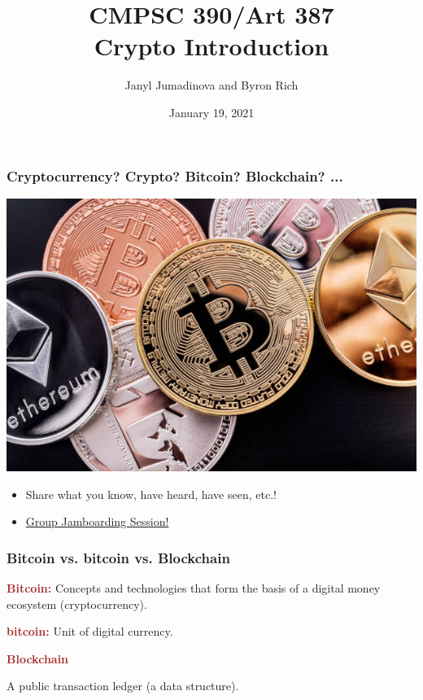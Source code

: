 \documentclass{beamer}
\title{CMPSC 390/Art 387 \\ Crypto Introduction }
\author{Janyl Jumadinova and Byron Rich}
\date{January 19, 2021}
\begin{document}
\begin{frame}
  \titlepage
\end{frame}

\begin{frame}
  \frametitle{Cryptocurrency? Crypto? Bitcoin? Blockchain? ... }
  	\centering \includegraphics[scale=1.6]{crypto}
	\begin{itemize}
		\item Share what you know, have heard, have seen, etc.! \pause
		\item \textcolor{blue}{\href{https://jamboard.google.com/d/11aMUTrsNXKniKVkajcfThbODdwsedcUUsrVuGIbXTAo/edit?usp=sharing}{Group Jamboarding Session!}}
	\end{itemize}
\end{frame}
\begin{frame}
  \frametitle{Bitcoin vs. bitcoin vs. Blockchain}
  
	\begin{block}{\textbf{\textcolor{brown}{Bitcoin:}}}
	Concepts and technologies that form the basis of a digital money ecosystem (cryptocurrency).
	\end{block}

    \pause
    
	\begin{block}{\textbf{\textcolor{brown}{bitcoin:}}}
	Unit of digital currency.
	\end{block}
	
	\pause
	
	\begin{block}{\textbf{\textcolor{brown}{Blockchain}}}

	A public transaction ledger (a data structure).

	\end{block}
\end{frame}
\end{document}
